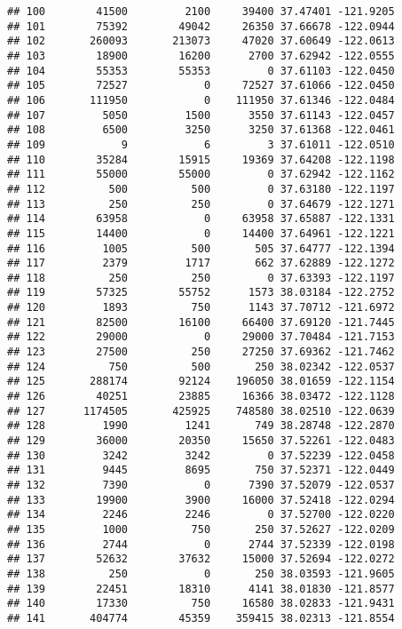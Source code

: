 \documentclass[
]{book}
\begin{document}
\begin{verbatim}
## 100        41500         2100     39400 37.47401 -121.9205
## 101        75392        49042     26350 37.66678 -122.0944
## 102       260093       213073     47020 37.60649 -122.0613
## 103        18900        16200      2700 37.62942 -122.0555
## 104        55353        55353         0 37.61103 -122.0450
## 105        72527            0     72527 37.61066 -122.0450
## 106       111950            0    111950 37.61346 -122.0484
## 107         5050         1500      3550 37.61143 -122.0457
## 108         6500         3250      3250 37.61368 -122.0461
## 109            9            6         3 37.61011 -122.0510
## 110        35284        15915     19369 37.64208 -122.1198
## 111        55000        55000         0 37.62942 -122.1162
## 112          500          500         0 37.63180 -122.1197
## 113          250          250         0 37.64679 -122.1271
## 114        63958            0     63958 37.65887 -122.1331
## 115        14400            0     14400 37.64961 -122.1221
## 116         1005          500       505 37.64777 -122.1394
## 117         2379         1717       662 37.62889 -122.1272
## 118          250          250         0 37.63393 -122.1197
## 119        57325        55752      1573 38.03184 -122.2752
## 120         1893          750      1143 37.70712 -121.6972
## 121        82500        16100     66400 37.69120 -121.7445
## 122        29000            0     29000 37.70484 -121.7153
## 123        27500          250     27250 37.69362 -121.7462
## 124          750          500       250 38.02342 -122.0537
## 125       288174        92124    196050 38.01659 -122.1154
## 126        40251        23885     16366 38.03472 -122.1128
## 127      1174505       425925    748580 38.02510 -122.0639
## 128         1990         1241       749 38.28748 -122.2870
## 129        36000        20350     15650 37.52261 -122.0483
## 130         3242         3242         0 37.52239 -122.0458
## 131         9445         8695       750 37.52371 -122.0449
## 132         7390            0      7390 37.52079 -122.0537
## 133        19900         3900     16000 37.52418 -122.0294
## 134         2246         2246         0 37.52700 -122.0220
## 135         1000          750       250 37.52627 -122.0209
## 136         2744            0      2744 37.52339 -122.0198
## 137        52632        37632     15000 37.52694 -122.0272
## 138          250            0       250 38.03593 -121.9605
## 139        22451        18310      4141 38.01830 -121.8577
## 140        17330          750     16580 38.02833 -121.9431
## 141       404774        45359    359415 38.02313 -121.8554

\end{verbatim}
\end{document}
